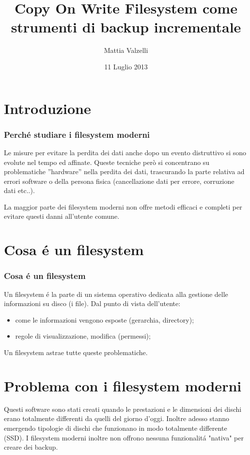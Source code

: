 \documentclass{beamer}
\title[COW Filesystem]{Copy On Write Filesystem come strumenti di backup incrementale}
\author[Mattia Valzelli]{Mattia Valzelli}
\institute[Univr]{Universit\`{a} degli studi di Verona}
\date{11 Luglio 2013}
\begin{document}
\begin{frame}
\titlepage
\end{frame}
\section{Introduzione} %
\begin{frame} %
\frametitle{Perch\'e studiare i filesystem moderni} %
Le misure per evitare la perdita dei dati anche dopo un evento distruttivo si sono evolute nel tempo ed affinate. Queste tecniche per\`o si concentrano su problematiche ”hardware” nella perdita dei dati, trascurando la parte relativa ad errori software o della persona fisica (cancellazione dati per errore, corruzione dati etc..).
\end{frame}

\begin{frame}
La maggior parte dei filesystem moderni non offre metodi efficaci e completi per evitare questi danni all'utente comune.
\end{frame}

\section{Cosa \'e un filesystem}
\begin{frame}
\frametitle{Cosa \'e un filesystem}
Un filesystem \'e la parte di un sistema operativo dedicata alla gestione delle informazioni su disco (i file). 
\newline
Dal punto di vista dell’utente:
\begin{itemize}
\item come le informazioni vengono esposte (gerarchia, directory);
\item regole di visualizzazione, modifica (permessi);
\end{itemize}
Un filesystem astrae tutte queste problematiche.
\end{frame}

\section{Problema con i filesystem moderni}
\begin{frame}
Questi software sono stati creati quando le prestazioni e le dimensioni dei dischi erano totalmente differenti da quelli del giorno d'oggi. Inoltre adesso stanno emergendo tipologie di dischi che funzionano in modo totalmente differente (SSD).
\newline
I filesystem moderni inoltre non offrono nessuna funzionalit\'a "nativa" per creare dei backup.
\end{frame}
\end{document}
